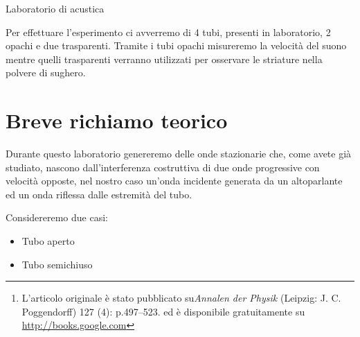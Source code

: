 \documentclass[a4paper,10pt,oneside]{article}
\begin{document}
\begin{center}
{\huge Laboratorio di acustica}
\end{center}

\begin{abstract}
In questo laboratorio ripeteremo l'esperimento di Kundt del 1866\footnote{L'articolo originale è stato pubblicato su\emph{Annalen der Physik} (Leipzig: J. C. Poggendorff) 127 (4): p.497–523. ed è disponibile gratuitamente su \url{http://books.google.com}} avvalendoci di una strumentazione più moderna che ci permetterà di effettuare delle osservazioni e delle misure impossibili ai tempi dello sperimentatore originale. Durante il laboratorio misureremo la velocità del suono, la lunghezza acustica di un tubo e la disposizione spaziale delle striature che si vengono a formare nella polvere di sughero a causa della risonanza.  
\end{abstract}

\vspace{3cm}

Per effettuare l'esperimento ci avverremo di 4 tubi, presenti in laboratorio, 2 opachi e due trasparenti. Tramite i tubi opachi misureremo la velocità del suono mentre quelli trasparenti verranno utilizzati per osservare le striature nella polvere di sughero.

\section{Breve richiamo teorico}

Durante questo laboratorio genereremo delle onde stazionarie che, come avete già studiato, nascono dall'interferenza costruttiva di due onde progressive con velocità opposte, nel nostro caso un'onda incidente generata da un altoparlante ed un onda riflessa dalle estremità del tubo. 

Considereremo due casi:
\begin{itemize}
 \item Tubo aperto
\item Tubo semichiuso
\end{itemize}
\end{document}

